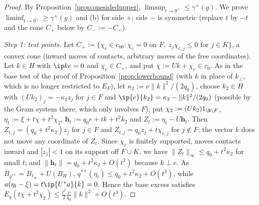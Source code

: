 \begin{proof}
By Proposition~\ref{prop:onesidedupper}, $\limsup_{t\to0^+}\le\gamma^+(g)$.
We prove $\liminf_{t\to0^+}\ge\gamma^+(g)$ and (b) for side $+$; side $-$
is symmetric (replace $t$ by $-t$ and the cone $C_+$ below by
$C_-:=-C_+$).

\emph{Step 1: test points.}  Let
$C_+:=\{\chi_c\in c_{00}:\chi_c=0\text{ on }F,\ z_j\chi_{c,j}\le0\text{ for }
j\in K\}$, a convex cone (inward moves of contacts, arbitrary moves of the
free coordinates).  Let $k\in H$ with $\ip ke=0$ and $\chi_c\in C_+$, and put
$\chi:=Uk+\chi_c\in c_0$.  As in the base test of the proof of
Proposition~\ref{prop:lowerbound} (with $k$ in place of $k_\perp$, which is
no longer restricted to $E_F$), let $\kappa_2:=\nu\|k\|^2/(2q_0)$, choose
$k_2\in H$ with $(Uk_2)_j=-\kappa_2z_j$ for $j\in F$ and
$\ip{e}{k_2}=\kappa_2-\|k\|^2/(2q_0)$ (possible by the Gram system there,
which only involves $F$), put $\chi_2:=(Uk_2)1_{\N\setminus F}$,
$\eta_t:=\xi+t\chi+t^2\chi_2$, $\mathbf h_t:=q_0e+tk+t^2k_2$ and
$Z_t:=\eta_t-U\mathbf h_t$.  Then $Z_{t,j}=(q_0+t^2\kappa_2)z_j$ for $j\in F$
and $Z_{t,j}=q_0z_j+t\chi_{c,j}$ for $j\notin F$: the vector $k$ does not
move any coordinate of $Z_t$.  Since $\chi_c$ is finitely supported, moves
contacts inward and $|z_j|<1$ on its support off $F\cup K$, we have
$\|Z_t\|_\infty\le q_0+t^2\kappa_2$ for small $t$; and $\|\mathbf h_t\|=
q_0+t^2\kappa_2+O(t^3)$ because $k\perp e$.  As
$B_{q^{**}}=B_{\ell_\infty}+U(B_H)$, $q^{**}(\eta_t)\le q_0+t^2\kappa_2+
O(t^3)$, while $a(\eta_t-\xi)=t\ip{U^*a}{k}=0$.  Hence the base excess
satisfies $E_q(t\chi+t^2\chi_2)\le\frac{t^2}2\frac\nu{q_0}\|k\|^2+O(t^3)$.


\end{proof}
